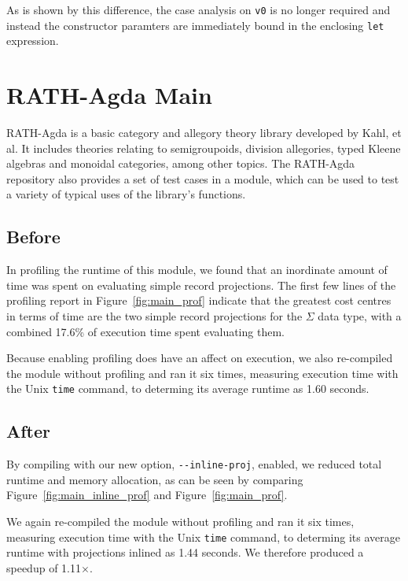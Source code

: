 As is shown by this difference, the case analysis on \lstinline{v0} is no longer required and instead the constructor paramters are immediately bound in the enclosing \lstinline{let} expression.


\section{RATH-Agda Main}
\label{sec:app_one}

RATH-Agda is a basic category and allegory theory library developed by Kahl, et al.\cite{kahl2017} It includes theories relating to semigroupoids, division allegories, typed Kleene algebras and monoidal categories, among other topics.\cite{kahl2017} The RATH-Agda repository also provides a set of test cases in a  module, which can be used to test a variety of typical uses of the library's functions.

\subsection{Before}

In profiling the runtime of this  module, we found that an inordinate amount of time was spent on evaluating simple record projections. The first few lines of the profiling report in Figure~\ref{fig:main_prof} indicate that the greatest cost centres in terms of time are the two simple record projections for the $\Sigma$ data type, with a combined 17.6\% of execution time spent evaluating them.

Because enabling profiling does have an affect on execution, we also re-compiled the module without profiling and ran it six times, measuring execution time with the Unix \texttt{time} command, to determing its average runtime as 1.60 seconds.



\subsection{After}

By compiling  with our new option, \texttt{-{}-inline-proj}, enabled, we reduced total runtime and memory allocation, as can be seen by comparing Figure~\ref{fig:main_inline_prof} and Figure~\ref{fig:main_prof}.

We again re-compiled the module without profiling and ran it six times, measuring execution time with the Unix \texttt{time} command, to determing its average runtime with projections inlined as 1.44 seconds. We therefore produced a speedup of 1.11$\times$.



